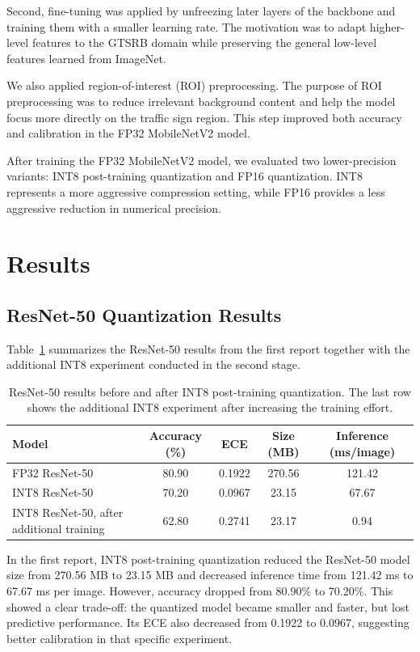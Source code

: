 \documentclass{article} %
\begin{document}
Second, fine-tuning was applied by unfreezing later layers of the backbone and training them with a smaller learning rate. The motivation was to adapt higher-level features to the GTSRB domain while preserving the general low-level features learned from ImageNet.

We also applied region-of-interest (ROI) preprocessing. The purpose of ROI preprocessing was to reduce irrelevant background content and help the model focus more directly on the traffic sign region. This step improved both accuracy and calibration in the FP32 MobileNetV2 model.

After training the FP32 MobileNetV2 model, we evaluated two lower-precision variants: INT8 post-training quantization and FP16 quantization. INT8 represents a more aggressive compression setting, while FP16 provides a less aggressive reduction in numerical precision.

\section{Results}

\subsection{ResNet-50 Quantization Results}

Table~\ref{tab:resnet_results} summarizes the ResNet-50 results from the first report together with the additional INT8 experiment conducted in the second stage.

\begin{table}[t]
\centering
\caption{ResNet-50 results before and after INT8 post-training quantization. The last row shows the additional INT8 experiment after increasing the training effort.}
\label{tab:resnet_results}
\begin{tabular}{lcccc}
\toprule
Model & Accuracy (\%) & ECE & Size (MB) & Inference (ms/image) \\
\midrule
FP32 ResNet-50 & 80.90 & 0.1922 & 270.56 & 121.42 \\
INT8 ResNet-50 & 70.20 & 0.0967 & 23.15 & 67.67 \\
INT8 ResNet-50, after additional training & 62.80 & 0.2741 & 23.17 & 0.94 \\
\bottomrule
\end{tabular}
\end{table}

In the first report, INT8 post-training quantization reduced the ResNet-50 model size from 270.56 MB to 23.15 MB and decreased inference time from 121.42 ms to 67.67 ms per image. However, accuracy dropped from 80.90\% to 70.20\%. This showed a clear trade-off: the quantized model became smaller and faster, but lost predictive performance. Its ECE also decreased from 0.1922 to 0.0967, suggesting better calibration in that specific experiment.
\end{document}
